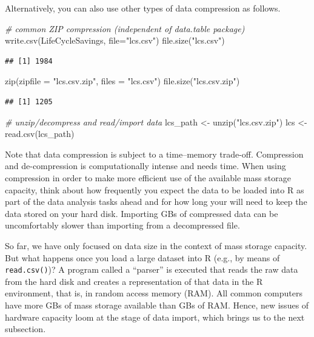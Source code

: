 \documentclass[
  12pt,
]{style/krantz}
\newenvironment{Shaded}{\begin{snugshade}}{\end{snugshade}}
\newcommand{\AttributeTok}[1]{\textcolor[rgb]{0.77,0.63,0.00}{#1}}
\newcommand{\CommentTok}[1]{\textcolor[rgb]{0.56,0.35,0.01}{\textit{#1}}}
\newcommand{\FunctionTok}[1]{\textcolor[rgb]{0.00,0.00,0.00}{#1}}
\newcommand{\NormalTok}[1]{#1}
\newcommand{\OtherTok}[1]{\textcolor[rgb]{0.56,0.35,0.01}{#1}}
\newcommand{\StringTok}[1]{\textcolor[rgb]{0.31,0.60,0.02}{#1}}
\begin{document}
Alternatively, you can also use other types of data compression as follows.

\begin{Shaded}
\begin{Highlighting}[]
\CommentTok{\# common ZIP compression (independent of data.table package)}
\FunctionTok{write.csv}\NormalTok{(LifeCycleSavings, }\AttributeTok{file=}\StringTok{"lcs.csv"}\NormalTok{)}
\FunctionTok{file.size}\NormalTok{(}\StringTok{"lcs.csv"}\NormalTok{)}
\end{Highlighting}
\end{Shaded}

\begin{verbatim}
## [1] 1984
\end{verbatim}

\begin{Shaded}
\begin{Highlighting}[]
\FunctionTok{zip}\NormalTok{(}\AttributeTok{zipfile =} \StringTok{"lcs.csv.zip"}\NormalTok{, }\AttributeTok{files =}  \StringTok{"lcs.csv"}\NormalTok{)}
\FunctionTok{file.size}\NormalTok{(}\StringTok{"lcs.csv.zip"}\NormalTok{)}
\end{Highlighting}
\end{Shaded}

\begin{verbatim}
## [1] 1205
\end{verbatim}

\begin{Shaded}
\begin{Highlighting}[]
\CommentTok{\# unzip/decompress and read/import data}
\NormalTok{lcs\_path }\OtherTok{\textless{}{-}} \FunctionTok{unzip}\NormalTok{(}\StringTok{"lcs.csv.zip"}\NormalTok{)}
\NormalTok{lcs }\OtherTok{\textless{}{-}} \FunctionTok{read.csv}\NormalTok{(lcs\_path)}
\end{Highlighting}
\end{Shaded}

Note that data compression is subject to a time--memory trade-off. Compression and de-compression is computationally intense and needs time. When using compression in order to make more efficient use of the available mass storage capacity, think about how frequently you expect the data to be loaded into R as part of the data analysis tasks ahead and for how long your will need to keep the data stored on your hard disk. Importing GBs of compressed data can be uncomfortably slower than importing from a decompressed file.

So far, we have only focused on data size in the context of mass storage capacity. But what happens once you load a large dataset into R (e.g., by means of \texttt{read.csv()})? A program called a ``parser'' is executed that reads the raw data from the hard disk and creates a representation of that data in the R environment, that is, in random access memory (RAM). All common computers have more GBs of mass storage available than GBs of RAM. Hence, new issues of hardware capacity loom at the stage of data import, which brings us to the next subsection.
\end{document}
